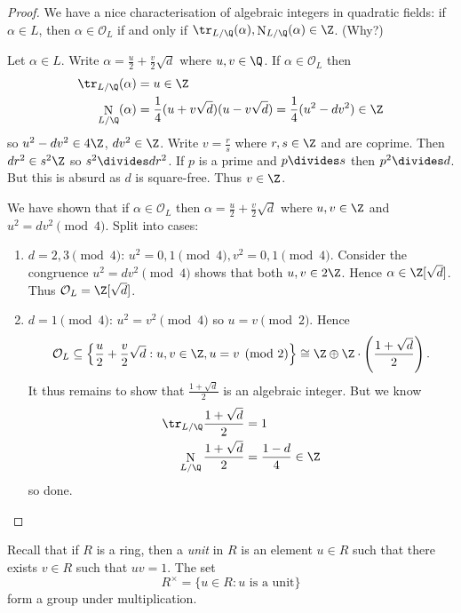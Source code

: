 \documentclass[a4paper]{article}
\renewcommand*{\O}{\mathcal{O}}
\DeclareMathOperator{\n}{N}
\begin{document}
\begin{proof}
  We have a nice characterisation of algebraic integers in quadratic fields: if \(\alpha \in L\), then \(\alpha \in \O_L\) if and only if \(\tr_{L/\Q}(\alpha), \n_{L/\Q}(\alpha) \in \Z\). (Why?)

  Let \(\alpha \in L\). Write \(\alpha = \frac{u}{2} + \frac{v}{2}\sqrt d\) where \(u, v \in \Q\). If \(\alpha \in \O_L\) then
  \begin{align*}
    \tr_{L/\Q}(\alpha) &= u \in \Z \\
    \n_{L/\Q}(\alpha) &= \frac{1}{4}(u + v\sqrt d)(u - v\sqrt d) = \frac{1}{4}(u^2 - dv^2) \in \Z
  \end{align*}
  so \(u^2 - dv^2 \in 4\Z\), \(dv^2 \in \Z\). Write \(v = \frac{r}{s}\) where \(r, s \in \Z\) and are coprime. Then \(dr^2 \in s^2\Z\) so \(s^2 \divides dr^2\). If \(p\) is a prime and \(p \divides s\) then \(p^2 \divides d\). But this is absurd as \(d\) is square-free. Thus \(v \in \Z\).

  We have shown that if \(\alpha \in \O_L\) then \(\alpha = \frac{u}{2} + \frac{v}{2}\sqrt d\) where \(u, v \in \Z\) and \(u^2 = dv^2 \pmod 4\). Split into cases:
  \begin{enumerate}
  \item \(d = 2, 3 \pmod 4\): \(u^2 = 0, 1 \pmod 4, v^2 = 0, 1 \pmod 4\). Consider the congruence \(u^2 =dv^2 \pmod 4\) shows that both \(u, v \in 2\Z\). Hence \(\alpha \in \Z[\sqrt d]\). Thus \(\O_L = \Z[\sqrt d]\).
  \item \(d = 1 \pmod 4\): \(u^2 = v^2 \pmod 4\) so \(u = v \pmod 2\). Hence
    \[
      \O_L \subseteq \left\{ \frac{u}{2} + \frac{v}{2}\sqrt d: u, v \in \Z, u = v \pmod 2 \right\} \cong \Z\oplus\Z\cdot \left(\frac{1 + \sqrt d}{2} \right).
    \]
    It thus remains to show that \(\frac{1 + \sqrt d}{2}\) is an algebraic integer. But we know
    \begin{align*}
      \tr_{L/\Q} \frac{1 + \sqrt d}{2} &= 1 \\
      \n_{L/\Q} \frac{1 + \sqrt d}{2} &= \frac{1 - d}{4} \in \Z
    \end{align*}
    so done.
  \end{enumerate}
\end{proof}

Recall that if \(R\) is a ring, then a \emph{unit} in \(R\) is an element \(u \in R\) such that there exists \(v \in R\) such that \(uv = 1\). The set
\[
  R^\times = \{u \in R: u \text{ is a unit}\}
\]
form a group under multiplication.
\end{document}
